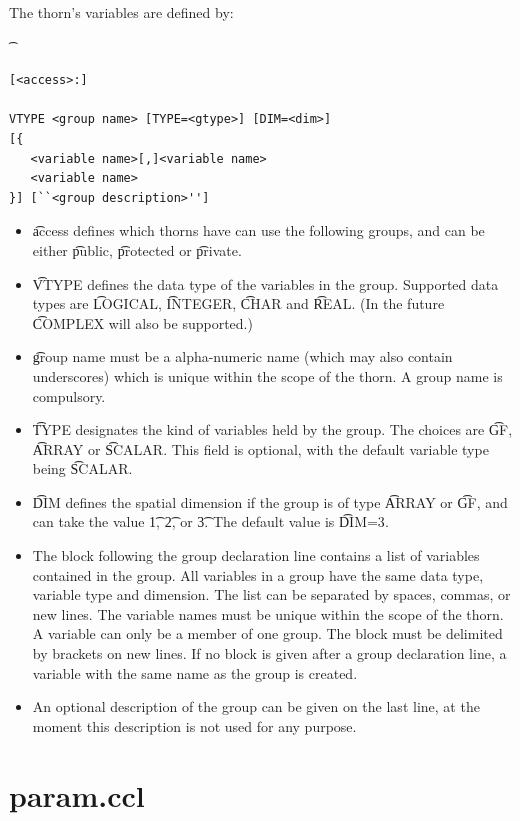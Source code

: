 The thorn's variables are defined by:
{\t
\begin{verbatim}
[<access>:]

VTYPE <group name> [TYPE=<gtype>] [DIM=<dim>] 
[{
   <variable name>[,]<variable name>
   <variable name>
}] [``<group description>'']
\end{verbatim}}

\begin{itemize}
\item{} {\t access} defines which thorns have can use the following 
        groups, and can be either {\t public}, {\t protected} or {\t private}.
\item{} {\t VTYPE} defines the data type of the variables in the group.
Supported data types are {\t LOGICAL}, {\t INTEGER}, {\t CHAR} and {\t REAL}.
(In the future {\t COMPLEX} will also be supported.)
\item{} {\t group name} must be a alpha-numeric name (which may also 
contain underscores) which is unique 
within the scope of the thorn. A group name is compulsory.
\item{} {\t TYPE} designates the kind of variables held by the group.
The choices are {\t GF}, {\t ARRAY} or {\t SCALAR}. This field is 
optional, with the default variable type being {\t SCALAR}.
\item{} {\t DIM} defines the spatial dimension if the group is of type
{\t ARRAY} or {\t GF}, and can take the value {\t 1}, {\t 2}, or {\t 3}.
The default value is {\t DIM=3}.
\item{} The block following the group declaration line contains a list of
        variables contained in the group. All variables in a group have 
        the same data type, variable type and dimension. The list can be 
        separated by spaces, commas, or new lines. The variable names 
        must be unique within the scope of the thorn. 
        A variable can only be a member of 
        one group. The block must be delimited by brackets on new lines.
        If no block is given after a group declaration line, a 
        variable with the same name as the group is created.
\item{} An optional description of the group can be given on the last line, 
        at the moment this description is not used for any purpose.
\end{itemize} 

\section{param.ccl}


